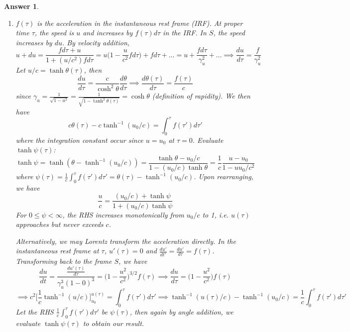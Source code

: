 \documentclass[a4paper]{article}
\theoremstyle{new2}
\newtheorem{ans}{Answer}[section]
\theoremstyle{new}
\begin{document}
\begin{ans}\leavevmode
\begin{enumerate}[label=(\alph*)]
\item $f(\tau)$ is the acceleration in the instantaneous rest frame (IRF). At proper time $\tau$, the speed is $u$ and increases by $f(\tau)d\tau$ in the IRF. In $S$, the speed increases by $du$. By velocity addition,
$$u+du=\frac{fd\tau+u}{1+(u/c^2)fd\tau}=u\bigg(1-\frac{u}{c^2}fd\tau\bigg)+fd\tau+\dots=u+\frac{fd\tau}{\gamma_u^2}+\dots\implies\frac{du}{d\tau}=\frac{f}{\gamma_u^2}$$
Let $u/c=\tanh\theta(\tau)$, then
$$\frac{du}{d\tau}=\frac{c}{\cosh^2\theta}\frac{d\theta}{d\tau}\implies\frac{d\theta(\tau)}{d\tau}=\frac{f(\tau)}{c}$$
since $\gamma_u=\frac{1}{\sqrt{1-u^2}}=\frac{1}{\sqrt{1-\tanh^2\theta(\tau)}}=\cosh\theta$ (definition of rapidity). We then have
$$c\theta(\tau)-c\tanh^{-1}(u_0/c)=\int_0^\tau f(\tau')d\tau'$$
where the integration constant occur since $u=u_0$ at $\tau=0$. Evaluate $\tanh\psi(\tau)$:
$$\tanh\psi=\tanh(\theta-\tanh^{-1}(u_0/c))=\frac{\tanh\theta-u_0/c}{1-(u_0/c)\tanh\theta}=\frac{1}{c}\frac{u-u_0}{1-uu_0/c^2}$$
where $\psi(\tau)=\frac{1}{c}\int_0^\tau f(\tau')d\tau'=\theta(\tau)-\tanh^{-1}(u_0/c)$. Upon rearranging, we have
$$\frac{u}{c}=\frac{(u_0/c)+\tanh\psi}{1+(u_0/c)\tanh\psi}$$
For $0\leq\psi<\infty$, the RHS increases monotonically from $u_0/c$ to 1, i.e. $u(\tau)$ approaches but never exceeds $c$.
\begin{center}
\end{center}
Alternatively, we may Lorentz transform the acceleration directly. In the instantaneous rest frame at $\tau$, $u'(\tau)=0$ and $\frac{du'}{dt'}=\frac{du'}{d\tau}=f(\tau)$. Transforming back to the frame $S$, we have
$$\frac{du}{dt}=\frac{\frac{du'(\tau)}{d\tau}}{\gamma_u^3(1-0)^3}=\bigg(1-\frac{u^2}{c^2}\bigg)^{3/2}f(\tau)\implies\frac{du}{d\tau}=\bigg(1-\frac{u^2}{c^2}\bigg)f(\tau)$$
$$\implies c^2\bigg[\frac{1}{c}\tanh^{-1}(u/c)\bigg]^{u(\tau)}_{u_0}=\int^\tau_0f(\tau')d\tau'\implies\tanh^{-1}(u(\tau)/c)-\tanh^{-1}(u_0/c)=\frac{1}{c}\int_0^\tau f(\tau')d\tau'$$
Let the RHS $\frac{1}{c}\int_0^\tau f(\tau')d\tau'$ be $\psi(\tau)$, then again by angle addition, we evaluate $\tanh\psi(\tau)$ to obtain our result.

\end{enumerate}
\end{ans}
\end{document}
